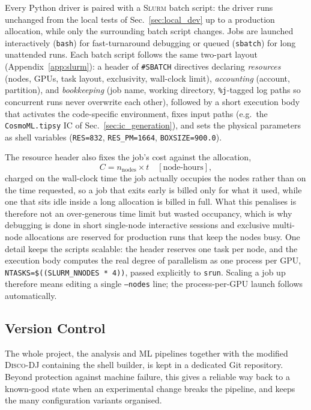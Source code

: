 \documentclass{report}
\begin{document}
Every Python driver is paired with a \textsc{Slurm} batch script: the driver runs unchanged from the local tests of Sec.~\ref{sec:local_dev} up to a production allocation, while only the surrounding batch script changes. Jobs are launched interactively (\texttt{bash}) for fast-turnaround debugging or queued (\texttt{sbatch}) for long unattended runs. Each batch script follows the same two-part layout (Appendix~\ref{app:slurm}): a header of \texttt{\#SBATCH} directives declaring \emph{resources} (nodes, GPUs, task layout, exclusivity, wall-clock limit), \emph{accounting} (account, partition), and \emph{bookkeeping} (job name, working directory, \texttt{\%j}-tagged log paths so concurrent runs never overwrite each other), followed by a short execution body that activates the code-specific environment, fixes input paths (e.g.\ the \texttt{CosmoML.tipsy} IC of Sec.~\ref{sec:ic_generation}), and sets the physical parameters as shell variables (\texttt{RES=832}, \texttt{RES\_PM=1664}, \texttt{BOXSIZE=900.0}).

The resource header also fixes the job's cost against the allocation,
\begin{equation}
    C = n_{\mathrm{nodes}} \times t \quad [\text{node-hours}],
    \label{eq:node_hours}
\end{equation}
charged on the wall-clock time the job actually occupies the nodes rather than on the time requested, so a job that exits early is billed only for what it used, while one that sits idle inside a long allocation is billed in full. What this penalises is therefore not an over-generous time limit but wasted occupancy, which is why debugging is done in short single-node interactive sessions and exclusive multi-node allocations are reserved for production runs that keep the nodes busy. One detail keeps the scripts scalable: the header reserves one task per node, and the execution body computes the real degree of parallelism as one process per GPU, \texttt{NTASKS=\$((SLURM\_NNODES * 4))}, passed explicitly to \texttt{srun}. Scaling a job up therefore means editing a single \texttt{--nodes} line; the process-per-GPU launch follows automatically.

\subsection{Version Control}

The whole project, the analysis and ML pipelines together with the modified \textsc{Disco-DJ} containing the shell builder, is kept in a dedicated Git repository. Beyond protection against machine failure, this gives a reliable way back to a known-good state when an experimental change breaks the pipeline, and keeps the many configuration variants organised.
\end{document}
